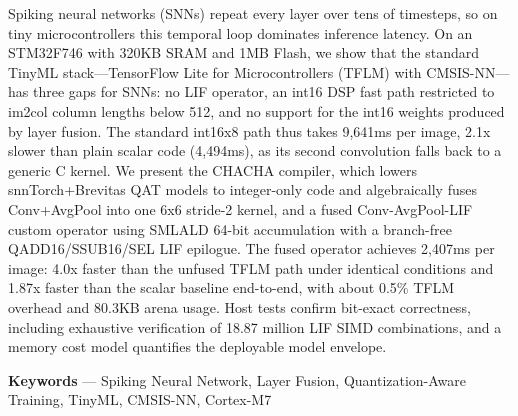 Spiking neural networks (SNNs) repeat every layer over tens of timesteps, so on tiny microcontrollers this temporal loop dominates inference latency. On an STM32F746 with 320KB SRAM and 1MB Flash, we show that the standard TinyML stack---TensorFlow Lite for Microcontrollers (TFLM) with CMSIS-NN---has three gaps for SNNs: no LIF operator, an int16 DSP fast path restricted to im2col column lengths below 512, and no support for the int16 weights produced by layer fusion. The standard int16x8 path thus takes 9,641ms per image, 2.1x slower than plain scalar code (4,494ms), as its second convolution falls back to a generic C kernel. We present the CHACHA compiler, which lowers snnTorch+Brevitas QAT models to integer-only code and algebraically fuses Conv+AvgPool into one 6x6 stride-2 kernel, and a fused Conv-AvgPool-LIF custom operator using SMLALD 64-bit accumulation with a branch-free QADD16/SSUB16/SEL LIF epilogue. The fused operator achieves 2,407ms per image: 4.0x faster than the unfused TFLM path under identical conditions and 1.87x faster than the scalar baseline end-to-end, with about 0.5\% TFLM overhead and 80.3KB arena usage. Host tests confirm bit-exact correctness, including exhaustive verification of 18.87 million LIF SIMD combinations, and a memory cost model quantifies the deployable model envelope.
\par\vspace{0.5\baselineskip}\noindent
\textbf{Keywords} --- Spiking Neural Network, Layer Fusion, Quantization-Aware Training, TinyML, CMSIS-NN, Cortex-M7
